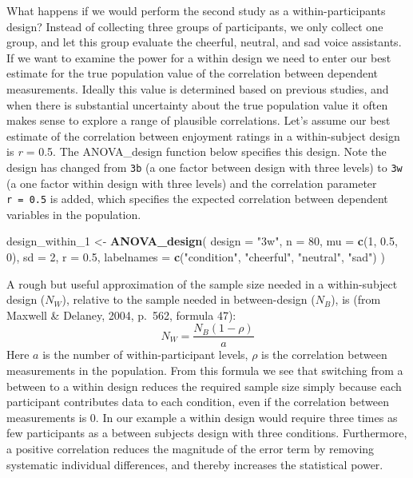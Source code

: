 \documentclass[
  ,jou,floatsintext]{apa6}
\newenvironment{Shaded}{\begin{snugshade}}{\end{snugshade}}
\newcommand{\DataTypeTok}[1]{\textcolor[rgb]{0.13,0.29,0.53}{#1}}
\newcommand{\DecValTok}[1]{\textcolor[rgb]{0.00,0.00,0.81}{#1}}
\newcommand{\FloatTok}[1]{\textcolor[rgb]{0.00,0.00,0.81}{#1}}
\newcommand{\KeywordTok}[1]{\textcolor[rgb]{0.13,0.29,0.53}{\textbf{#1}}}
\newcommand{\NormalTok}[1]{#1}
\newcommand{\StringTok}[1]{\textcolor[rgb]{0.31,0.60,0.02}{#1}}
\begin{document}
What happens if we would perform the second study as a within-participants design?
Instead of collecting three groups of participants, we only collect one group, and let this group evaluate the cheerful, neutral, and sad voice assistants.
If we want to examine the power for a within design we need to enter our best estimate for the true population value of the correlation between dependent measurements.
Ideally this value is determined based on previous studies, and when there is substantial uncertainty about the true population value it often makes sense to explore a range of plausible correlations.
Let's assume our best estimate of the correlation between enjoyment ratings in a within-subject design is \emph{r} = 0.5.
The ANOVA\_design function below specifies this design.
Note the design has changed from \texttt{3b} (a one factor between design with three levels) to \texttt{3w} (a one factor within design with three levels) and the correlation parameter \texttt{r\ =\ 0.5} is added, which specifies the expected correlation between dependent variables in the population.

\begin{Shaded}
\begin{Highlighting}[]
\NormalTok{design_within_}\DecValTok{1}\NormalTok{ <-}\StringTok{ }\KeywordTok{ANOVA_design}\NormalTok{(}
  \DataTypeTok{design =} \StringTok{"3w"}\NormalTok{, }\DataTypeTok{n =} \DecValTok{80}\NormalTok{, }\DataTypeTok{mu =} \KeywordTok{c}\NormalTok{(}\DecValTok{1}\NormalTok{, }\FloatTok{0.5}\NormalTok{, }\DecValTok{0}\NormalTok{), }
  \DataTypeTok{sd =} \DecValTok{2}\NormalTok{, }\DataTypeTok{r =} \FloatTok{0.5}\NormalTok{,}
  \DataTypeTok{labelnames =} \KeywordTok{c}\NormalTok{(}\StringTok{"condition"}\NormalTok{, }
                 \StringTok{"cheerful"}\NormalTok{, }
                 \StringTok{"neutral"}\NormalTok{, }\StringTok{"sad"}\NormalTok{)}
\NormalTok{)}
\end{Highlighting}
\end{Shaded}

A rough but useful approximation of the sample size needed in a within-subject design (\(N_W\)), relative to the sample needed in between-design (\(N_B\)), is (from Maxwell \& Delaney, 2004, p.~562, formula 47):
\begin{equation}
N_{W}=\frac{N_{B}(1-\rho)}{a} \label{eq:within-n}
\end{equation}
Here \(a\) is the number of within-participant levels, \(\rho\) is the correlation between measurements in the population.
From this formula we see that switching from a between to a within design reduces the required sample size simply because each participant contributes data to each condition, even if the correlation between measurements is 0.
In our example a within design would require three times as few participants as a between subjects design with three conditions.
Furthermore, a positive correlation reduces the magnitude of the error term by removing systematic individual differences, and thereby increases the statistical power.
\end{document}
